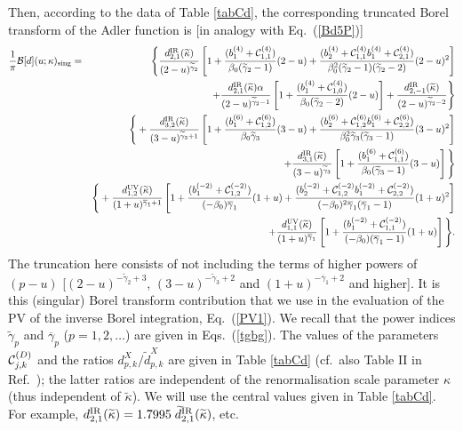 \documentclass[aps,nofootinbib,showkeys,noshowpacs,preprintnumbers,amsmath,amssymb]{revtex4}
\def\bea{\begin{eqnarray}}
\def\eea{\end{eqnarray}}
\newcommand{\tkap}{{\widetilde \kappa}}
\newcommand{\td}{{\widetilde d}}
\newcommand{\tg}{{\widetilde {\gamma}}}
\newcommand{\bg}{{\overline {\gamma}}}
\begin{document}
Then, according to the data of Table \ref{tabCd}, the corresponding truncated Borel transform of the Adler function is [in analogy with Eq.~(\ref{Bd5P})]
\bea
\frac{1}{\pi}{\cal B}[d](u;\kappa)_{\rm sing} & = &
{\Bigg \{}
\frac{d_{2,1}^{\rm IR}(\tkap)}{(2 - u)^{\tg_2}} \left[ 1 + \frac{(b_1^{(4)}+{\cal C}_{1,1}^{(4)})}{\beta_0 (\tg_2-1)} (2-u) + \frac{(b_2^{(4)}+{\cal C}_{1,1}^{(4)} b_1^{(4)} +{\cal C}_{2,1}^{(4)})}{ \beta_0^2 (\tg_2-1)(\tg_2-2)} (2-u)^2 \right]
\nonumber\\ &&
+ \frac{d_{2,1}^{\rm IR}(\tkap) \alpha}{(2 - u)^{\tg_2-1}}  \left[ 1 + \frac{(b_1^{(4)}+{\cal C}_{1,0}^{(4)})}{\beta_0 (\tg_2-2)} (2-u) \right]
+ \frac{d_{2,-1}^{\rm IR}(\tkap)}{(2 - u)^{\tg_2-2}}
{\Bigg \}}
\nonumber\\ &&
{\Bigg \{}
+ \frac{d_{3,2}^{\rm IR}(\tkap)}{(3 - u)^{\tg_3+1}} \left[ 1 + \frac{(b_1^{(6)}+{\cal C}_{1,2}^{(6)})}{\beta_0 \tg_3} (3-u) + \frac{(b_2^{(6)}+{\cal C}_{1,2}^{(6)} b_1^{(6)} +{\cal C}_{2,2}^{(6)})}{ \beta_0^2 \tg_3 (\tg_3-1)} (3 - u)^2 \right]
\nonumber\\ &&
+ \frac{d_{3,1}^{\rm IR}(\tkap)}{(3 - u)^{\tg_3}} \left[ 1 + \frac{(b_1^{(6)}+{\cal C}_{1,1}^{(6)})}{\beta_0 (\tg_3-1)} (3-u) \right]
{\Bigg \}}
\nonumber\\ &&
{\Bigg \{}
+ \frac{d_{1,2}^{\rm UV}(\tkap)}{(1+ u)^{\bg_1+1}} \left[ 1 + \frac{(b_1^{(-2)}+{\cal C}_{1,2}^{(-2)})}{(-\beta_0) \bg_1} (1+u) + \frac{(b_2^{(-2)}+{\cal C}_{1,2}^{(-2)} b_1^{(-2)} +{\cal C}_{2,2}^{(-2)})}{ (-\beta_0)^2 \bg_1 (\bg_1-1)} (1+ u)^2 \right]
\nonumber\\ &&
+ \frac{d_{1,1}^{\rm UV}(\tkap)}{(1+ u)^{\bg_1}} \left[ 1 + \frac{(b_1^{(-2)}+{\cal C}_{1,1}^{(-2)})}{(-\beta_0) (\bg_1-1)} (1+u) \right]
{\Bigg \}}.
\label{Bd5Pkap}
\eea
The truncation here consists of not including the terms of higher powers of $(p-u)$ [$(2-u)^{-\tg_2+3}$, $(3-u)^{-\tg_3+2}$ and $(1+u)^{-\bg_1+2}$ and higher].
It is this (singular) Borel transform contribution that we use in the evaluation of the PV of the inverse Borel integration, Eq.~(\ref{PV1}). We recall that the power indices $\tg_p$ and $\bg_p$ ($p=1,2,\ldots$) are given in Eqs.~(\ref{tgbg}).  The values of the parameters ${\cal C}_{j,k}^{(D)}$ and the ratios $d_{p,k}^X/{\td}_{p,k}^X$ are given in Table \ref{tabCd} (cf.~also Table II in Ref.~\cite{renmod}); the latter ratios are independent of the renormalisation scale parameter $\kappa$ (thus independent of $\tkap$). We will use the central values given in Table \ref{tabCd}. For example, $d_{2,1}^{\rm IR}(\tkap)=1.7995 \; \td_{2,1}^{\rm IR}(\tkap)$, etc.
\end{document}
